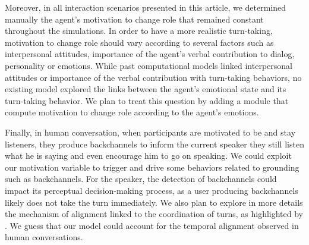 Moreover, in all interaction scenarios presented in this article,  we determined manually the agent's motivation to change role that remained constant throughout the simulations. In order to have a more realistic turn-taking, motivation to change role should vary according to several factors such as interpersonal attitudes, importance of the agent's verbal contribution to dialog, personality or emotions. While past computational models linked interpersonal attitudes \citep{ravenet_conversational_2015} or importance of the verbal contribution \citep{selfridge_bidding_2009} with turn-taking behaviors, no existing model explored the links between the agent's emotional state and its turn-taking behavior. We plan to treat this question by adding a module that compute motivation to change role according to the agent's emotions. 

Finally, in human conversation, when participants are motivated to be and stay listeners, they produce backchannels to inform the current speaker they still listen what he is saying and even encourage him to go on speaking. 
We could exploit our motivation variable to trigger and drive some behaviors related to grounding such as backchannels. 
For the speaker, the detection of backchannels could impact its perceptual decision-making process, as a user producing backchannels likely does not take the turn immediately.
We also plan to explore in more details the mechanism of alignment linked to the coordination of turns, as highlighted by \citep{benus_pragmatic_2011}.
We guess that our model could account for the temporal alignment observed in human conversations.  




% 
